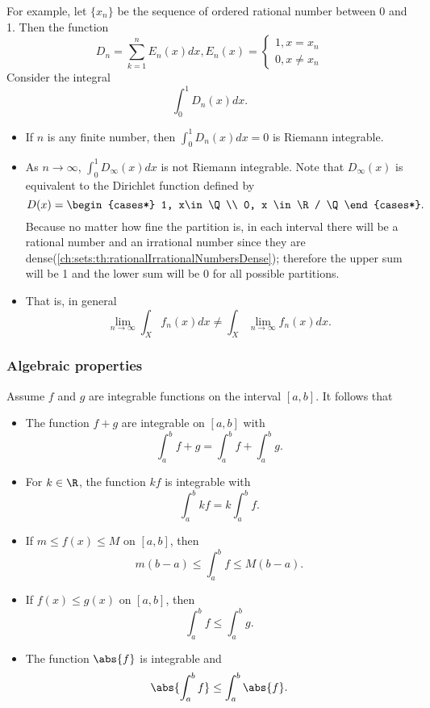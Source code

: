 \begin{refsection}
\begin{note}
For example, let $\{x_n\}$ be the sequence of ordered rational number between 0 and 1.  Then the function 
$$D_n = \sum_{k=1}^n E_n(x)dx, E_n(x) = \begin{cases*}
1, x = x_n\\
0, x \neq x_n
\end{cases*}$$ 
Consider the integral
$$\int_0^1 D_n(x)dx.$$
\begin{itemize}
	\item If $n$ is any finite number, then $\int_0^1 D_n(x)dx = 0$ is Riemann integrable.
	\item As $n\to \infty$, $\int_0^1 D_\infty(x)dx$ is not Riemann integrable. Note that $D_\infty(x)$ is equivalent to the Dirichlet function defined by
	$$D(x) = \begin{cases*}
	1, x\in \Q\\
	0, x \in \R / \Q
	\end{cases*}.$$
	  Because no matter how fine the partition is, in each interval there will be a rational number and an irrational number since they are dense(\autoref{ch:sets:th:rationalIrrationalNumbersDense}); therefore the upper sum will be 1 and the lower sum will be 0 for all possible partitions.
	\item That is, in general
	$$\lim_{n\to \infty} \int_X f_n(x)dx \neq \int_X \lim_{n\to \infty}f_n(x)dx.$$
\end{itemize}	
	
\end{note}

\subsubsection{Algebraic properties}

\begin{theorem}\cite[229]{abbott2001understanding} Assume $f$ and $g$ are integrable functions on the interval $[a,b]$. It follows that
	\begin{itemize}
		\item The function $f + g$ are integrable on $[a,b]$ with 
		$$\int_a^b f+g = \int_a^b f + \int_a^b g.$$
		\item For $k\in \R$, the function $kf$ is integrable with 
		$$\int_a^b kf = k \int_a^b f.$$
		\item If $m\leq f(x)\leq M$ on $[a,b]$, then
		$$m(b-a) \leq \int_a^b f \leq M(b-a).$$
		\item If $ f(x)\leq g(x)$ on $[a,b]$, then
		$$\int_a^b f \leq \int_a^b g.$$
		\item The function $\abs{f}$ is integrable and
		$$\abs{\int_a^b f} \leq \int_a^b \abs{f}.$$
	\end{itemize}
\end{theorem}




\end{refsection}
